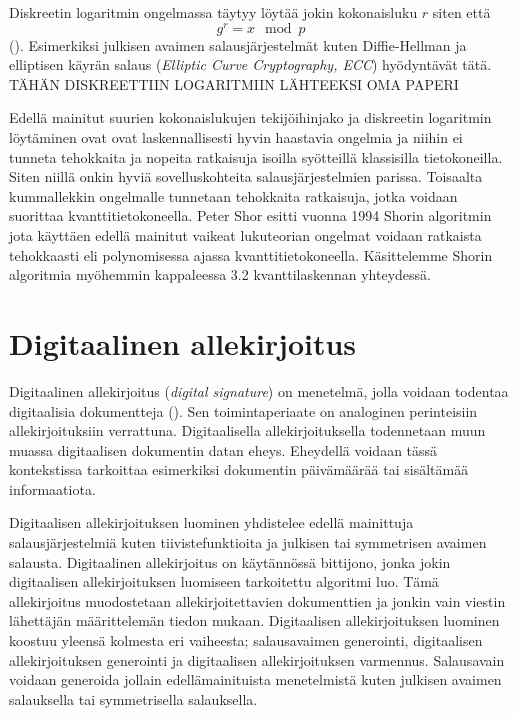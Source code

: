  Diskreetin logaritmin ongelmassa täytyy löytää jokin kokonaisluku 
 $r$ siten että
 \[g^{r} = x \mod p\]
 (\cite{mavroeidis2018impact}). Esimerkiksi julkisen avaimen salausjärjestelmät kuten Diffie-Hellman ja elliptisen käyrän salaus (\emph{Elliptic Curve Cryptography, ECC}) hyödyntävät tätä. TÄHÄN DISKREETTIIN LOGARITMIIN LÄHTEEKSI OMA PAPERI
 
 Edellä mainitut suurien kokonaislukujen tekijöihinjako ja diskreetin logaritmin löytäminen ovat ovat laskennallisesti hyvin haastavia ongelmia ja niihin ei tunneta tehokkaita ja nopeita ratkaisuja isoilla syötteillä klassisilla tietokoneilla. Siten niillä onkin hyviä sovelluskohteita salausjärjestelmien parissa. Toisaalta kummallekkin ongelmalle tunnetaan tehokkaita ratkaisuja, jotka voidaan suorittaa kvanttitietokoneella. Peter Shor esitti vuonna 1994 Shorin algoritmin jota käyttäen edellä mainitut vaikeat lukuteorian ongelmat voidaan ratkaista tehokkaasti eli polynomisessa ajassa kvanttitietokoneella. Käsittelemme Shorin algoritmia myöhemmin kappaleessa 3.2 kvanttilaskennan yhteydessä.
 
 \section{Digitaalinen allekirjoitus}
 Digitaalinen allekirjoitus (\emph{digital signature}) on menetelmä, jolla voidaan todentaa digitaalisia dokumentteja (\cite{1649003}). Sen toimintaperiaate on analoginen perinteisiin allekirjoituksiin verrattuna. Digitaalisella allekirjoituksella todennetaan muun muassa digitaalisen dokumentin datan eheys. Eheydellä voidaan tässä kontekstissa tarkoittaa esimerkiksi dokumentin päivämäärää tai sisältämää informaatiota.
 
 Digitaalisen allekirjoituksen luominen yhdistelee edellä mainittuja salausjärjestelmiä kuten tiivistefunktioita ja julkisen tai symmetrisen avaimen salausta. Digitaalinen allekirjoitus on käytännössä bittijono, jonka jokin digitaalisen allekirjoituksen luomiseen tarkoitettu algoritmi luo. Tämä allekirjoitus muodostetaan allekirjoitettavien dokumenttien ja jonkin vain viestin lähettäjän määrittelemän tiedon mukaan. Digitaalisen allekirjoituksen luominen koostuu yleensä kolmesta eri vaiheesta; salausavaimen generointi, digitaalisen allekirjoituksen generointi ja digitaalisen allekirjoituksen varmennus. Salausavain voidaan generoida jollain edellämainituista menetelmistä kuten julkisen avaimen salauksella tai symmetrisella salauksella.